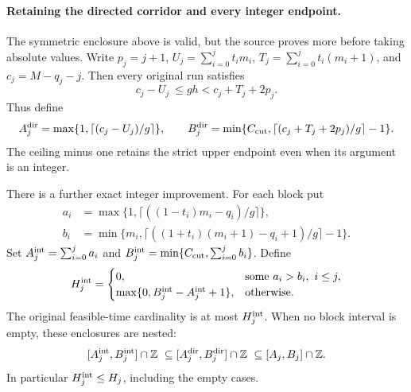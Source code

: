 \paragraph{Retaining the directed corridor and every integer endpoint.}
The symmetric enclosure above is valid, but the source proves more before
taking absolute values. Write \(p_j=j+1\),
\(U_j=\sum_{i=0}^j t_i m_i\), \(T_j=\sum_{i=0}^j t_i(m_i+1)\), and
\(c_j=M-q_j-j\). Then every original run satisfies
\begin{equation}\label{eq:Shaik-moving-directed-corridor}
 c_j-U_j\ \le gh<c_j+T_j+2p_j.
\end{equation}
Thus define
\[
 A_j^{\rm dir}=\max\{1,\lceil(c_j-U_j)/g\rceil\},\qquad
 B_j^{\rm dir}=\min\{C_{\rm cut},
           \lceil(c_j+T_j+2p_j)/g\rceil-1\}.
\]
The ceiling minus one retains the strict upper endpoint even when its
argument is an integer.

There is a further exact integer improvement. For each block put
\begin{align*}
 a_i&=\max\{1,\lceil((1-t_i)m_i-q_i)/g\rceil\},\\
 b_i&=\min\{m_i,\lceil((1+t_i)(m_i+1)-q_i+1)/g\rceil-1\}.
\end{align*}
Set \(A_j^{\rm int}=\sum_{i=0}^j a_i\) and
\(B_j^{\rm int}=\min\{C_{\rm cut},\sum_{i=0}^j b_i\}\). Define
\begin{equation}\label{eq:Shaik-moving-blockwise-support}
 H_j^{\rm int}=
 \begin{cases}
  0,&\text{some }a_i>b_i,\ i\le j,\\
  \max\{0,B_j^{\rm int}-A_j^{\rm int}+1\},&\text{otherwise}.
 \end{cases}
\end{equation}
The original feasible-time cardinality is at most \(H_j^{\rm int}\).
When no block interval is empty, these enclosures are nested:
\[
 [A_j^{\rm int},B_j^{\rm int}]\cap\mathbb Z
 \ \subseteq [A_j^{\rm dir},B_j^{\rm dir}]\cap\mathbb Z
 \ \subseteq [A_j,B_j]\cap\mathbb Z .
\]
In particular \(H_j^{\rm int}\le H_j\), including the empty cases.

